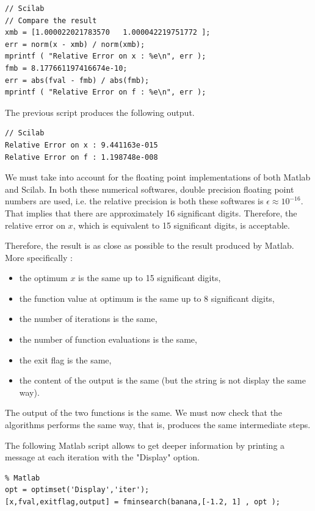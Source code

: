 \lstset{language=scilabscript}
\begin{lstlisting}
// Scilab
// Compare the result
xmb = [1.000022021783570   1.000042219751772 ];
err = norm(x - xmb) / norm(xmb);
mprintf ( "Relative Error on x : %e\n", err );
fmb = 8.177661197416674e-10;
err = abs(fval - fmb) / abs(fmb);
mprintf ( "Relative Error on f : %e\n", err );
\end{lstlisting}

The previous script produces the following output.

\lstset{language=scilabscript}
\begin{lstlisting}
// Scilab
Relative Error on x : 9.441163e-015
Relative Error on f : 1.198748e-008
\end{lstlisting}

We must take into account for the floating point implementations 
of both Matlab and Scilab. In both these numerical softwares,
double precision floating point numbers are used, i.e. the relative 
precision is both these softwares is $\epsilon \approx 10^{-16}$. 
That implies that there are approximately 16 significant digits.
Therefore, the relative error on $x$, which is equivalent to 15
significant digits, is acceptable. 

Therefore, the result is as close as possible to the result produced 
by Matlab. More specifically :
\begin{itemize}
\item the optimum $x$ is the same up to 15 significant digits,
\item the function value at optimum is the same up to 8 significant digits,
\item the number of iterations is the same,
\item the number of function evaluations is the same,
\item the exit flag is the same,
\item the content of the output is the same (but the string is not 
display the same way).
\end{itemize}

The output of the two functions is the same. 
We must now check that the algorithms performs the same way,
that is, produces the same intermediate steps.

The following Matlab script allows to get deeper information by printing a message at each iteration
with the "Display" option.

\lstset{language=matlabscript}
\begin{lstlisting}
% Matlab
opt = optimset('Display','iter');
[x,fval,exitflag,output] = fminsearch(banana,[-1.2, 1] , opt );
\end{lstlisting}

